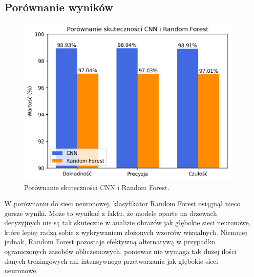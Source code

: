 \documentclass{article}
\begin{document}
\subsection{Porównanie wyników}
\begin{figure}[H]
\centering
\includegraphics[width=\textwidth]{performanceComparison.png}
\caption{Porównanie skuteczności CNN i Random Forest.}
\end{figure}

W porównaniu do sieci neuronowej, klasyfikator Random Forest osiągnął nieco gorsze wyniki. Może to wynikać z faktu, że modele oparte na drzewach decyzyjnych nie są tak skuteczne w analizie obrazów jak głębokie sieci neuronowe, które lepiej radzą sobie z wykrywaniem złożonych wzorców wizualnych. Niemniej jednak, Random Forest pozostaje efektywną alternatywą w przypadku ograniczonych zasobów obliczeniowych, ponieważ nie wymaga tak dużej ilości danych treningowych ani intensywnego przetwarzania jak głębokie sieci neuronowe.
\end{document}

